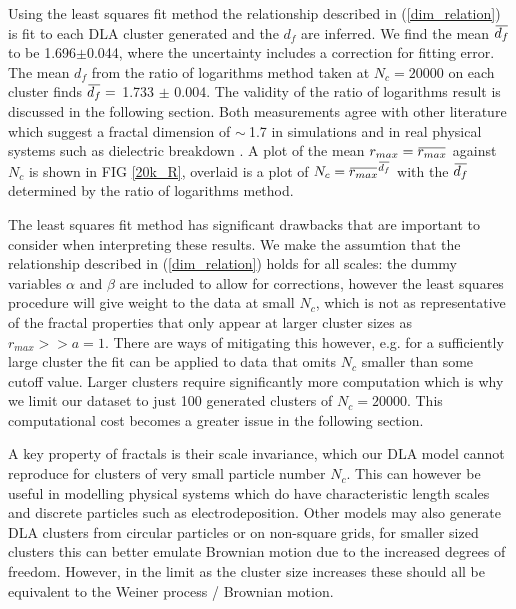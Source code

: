 \documentclass[10pt, twocolumn]{article} %
\newcommand{\overbar}[1]{\mkern 1.5mu\overline{\mkern-1.5mu#1\mkern-1.5mu}\mkern 1.5mu}
\begin{document}
  Using the least squares fit method the relationship described in (\ref{dim_relation}) is fit to each DLA cluster generated and the $d_f$ are inferred. We find the mean $\overbar{d_f}$ to be 1.696$\pm$0.044, where the uncertainty includes a correction for fitting error. The mean $d_f$ from the ratio of logarithms method taken at $N_c = 20000$ on each cluster finds $\overbar{d_f} =$ 1.733 $\pm$ 0.004. The validity of the ratio of logarithms result is discussed in the following section. Both measurements agree with other literature which suggest a fractal dimension of $\sim~$1.7 in simulations \cite{Witten_1981, Choi_2011, Ranguelov_2011} and in real physical systems such as dielectric breakdown \cite{Pietronero_1984, Irurzun_2002}. A plot of the mean $r_{max} = \overbar{r_{max}}$ against $N_c$ is shown in FIG \ref{20k_R}, overlaid is a plot of $N_c={\overbar{r_{max}}}^{\overbar{d_f}}$ with the $\overbar{d_f}$ determined by the ratio of logarithms method.

  The least squares fit method has significant drawbacks that are important to consider when interpreting these results. We make the assumtion that the relationship described in (\ref{dim_relation}) holds for all scales: the dummy variables $\alpha$ and $\beta$ are included to allow for corrections, however the least squares procedure will give weight to the data at small $N_c$, which is not as representative of the fractal properties that only appear at larger cluster sizes as $r_{max} >> a=1$. There are ways of mitigating this however, e.g. for a sufficiently large cluster the fit can be applied to data that omits $N_c$ smaller than some cutoff value. Larger clusters require significantly more computation which is why we limit our dataset to just 100 generated clusters of $N_c = 20000$. This computational cost becomes a greater issue in the following section.

  A key property of fractals is their scale invariance, which our DLA model cannot reproduce for clusters of very small particle number $N_c$. This can however be useful in modelling physical systems which do have characteristic length scales and discrete particles such as electrodeposition\cite{Shaikh_2022}. Other models may also generate DLA clusters from circular particles or on non-square grids, for smaller sized clusters this can better emulate Brownian motion due to the increased degrees of freedom. However, in the limit as the cluster size increases these should all be equivalent to the Weiner process / Brownian motion.
\end{document}
